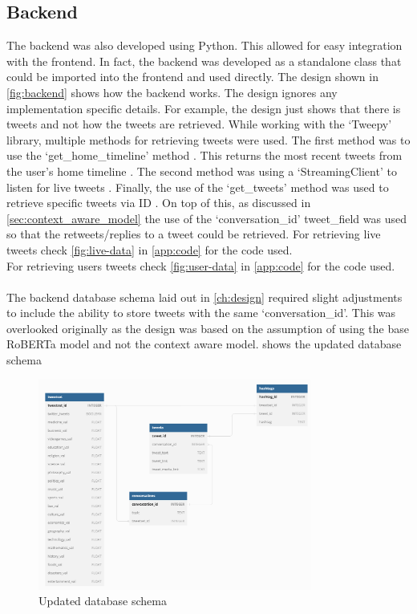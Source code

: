 \subsection{Backend}
The backend was also developed using Python. This allowed for easy integration with the frontend. In fact, the backend was developed as a standalone
class that could be imported into the frontend and used directly. The design shown in \cref{fig:backend} shows how the backend works. The design
ignores any implementation specific details. For example, the design just shows that there is tweets and not how the tweets are retrieved.
While working with the `Tweepy' library, multiple methods for retrieving tweets were used. The first method was to use the `get\_home\_timeline'
method \cite{tweepy}. This returns the most recent tweets from the user's home timeline \cite{tweepy}. The second method was using a `StreamingClient' to listen for
live tweets \cite{tweepy}. Finally, the use of the `get\_tweets' method was used to retrieve specific tweets via ID \cite{tweepy}. On top of this, as discussed in \cref{sec:context_aware_model}
the use of the `conversation\_id' tweet\_field was used so that the retweets/replies to a tweet could be retrieved.
For retrieving live tweets check \cref{fig:live-data} in \cref{app:code} for the code used.\\
For retrieving users tweets check \cref{fig:user-data} in \cref{app:code} for the code used.\\\\
The backend database schema laid out in \cref{ch:design} required slight adjustments to include the ability to store tweets with the same `conversation\_id'.
This was overlooked originally as the design was based on the assumption of using the base RoBERTa model and not the context aware model.
 shows the updated database schema
\newpage
\begin{figure}[hbtp]
    \centering
    \includegraphics[width=0.8\textwidth]{../images/updated-schema.png}
    \caption{Updated database schema}
    \label{fig:updated-schema}
\end{figure}

